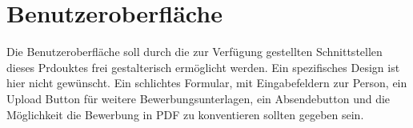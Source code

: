\section{Benutzeroberfläche}

    Die Benutzeroberfläche soll durch die zur Verfügung gestellten Schnittstellen dieses Prdouktes frei gestalterisch ermöglicht werden. Ein spezifisches Design ist hier nicht gewünscht. Ein schlichtes Formular, mit Eingabefeldern zur Person, ein Upload Button für weitere Bewerbungsunterlagen, ein Absendebutton und die Möglichkeit die Bewerbung in PDF zu konventieren sollten gegeben sein.